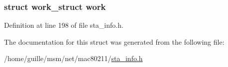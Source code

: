 \hypertarget{structsta__ampdu__mlme_a623997e11b94d7c467ce26627cc488a2}{
\subsubsection[{work}]{\setlength{\rightskip}{0pt plus 5cm}struct work\-\_\-struct work}}\label{structsta__ampdu__mlme_a623997e11b94d7c467ce26627cc488a2}


Definition at line 198 of file sta\-\_\-info.\-h.



The documentation for this struct was generated from the following file\-:\begin{DoxyCompactItemize}
\item 
/home/guille/msm/net/mac80211/\hyperlink{sta__info_8h}{sta\-\_\-info.\-h}\end{DoxyCompactItemize}
